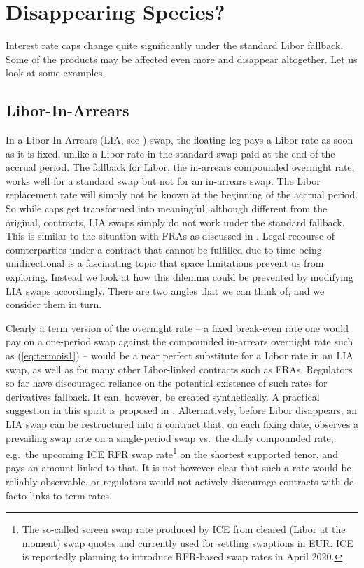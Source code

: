 \documentclass{article}
\begin{document}
\section{Disappearing Species?}

Interest rate caps change quite significantly under the standard Libor
fallback. Some of the products may be affected even more and disappear
altogether. Let us look at some examples.

\subsection{Libor-In-Arrears\label{sec:lia}}

In a Libor-In-Arrears (LIA, see \cite{ap-book}) swap, the floating leg pays
a Libor rate as soon as it is fixed, unlike a Libor rate in the standard
swap paid at the end of the accrual period. The fallback for Libor, the
in-arrears compounded overnight rate, works well for a standard swap but not
for an in-arrears swap. The Libor replacement rate will simply not be known
at the beginning of the accrual period. So while caps get transformed into
meaningful, although different from the original, contracts, LIA swaps
simply do not work under the standard fallback. This is similar to the
situation with FRAs as discussed in \cite{henrard-qse1}. Legal recourse of
counterparties under a contract that cannot be fulfilled due to time being
unidirectional is a fascinating topic that space limitations prevent us from
exploring. Instead we look at how this dilemma could be prevented by
modifying LIA swaps accordingly. There are two angles that we can think of,
and we consider them in turn.

Clearly a term version of the overnight rate -- a fixed break-even rate one
would pay on a one-period swap against the compounded in-arrears overnight
rate such as (\ref{eq:termois1}) -- would be a near perfect substitute for a
Libor rate in an LIA swap, as well as for many other Libor-linked contracts
such as FRAs. Regulators so far have discouraged reliance on the potential
existence of such rates for derivatives fallback. It can, however, be
created synthetically. A practical suggestion in this spirit is proposed in 
\cite{henrard-blog1}. Alternatively, before Libor disappears, an LIA swap
can be restructured into a contract that, on each fixing date, observes a
prevailing swap rate on a single-period swap vs.~the daily compounded rate,
e.g.~the upcoming ICE RFR swap rate\footnote{%
The so-called screen swap rate produced by ICE from cleared (Libor at the
moment) swap quotes and currently used for settling swaptions in EUR. ICE is
reportedly planning to introduce RFR-based swap rates in April 2020. } on
the shortest supported tenor, and pays an amount linked to that. It is not
however clear that such a rate would be reliably observable, or regulators
would not actively discourage contracts with de-facto links to term rates.
\end{document}
